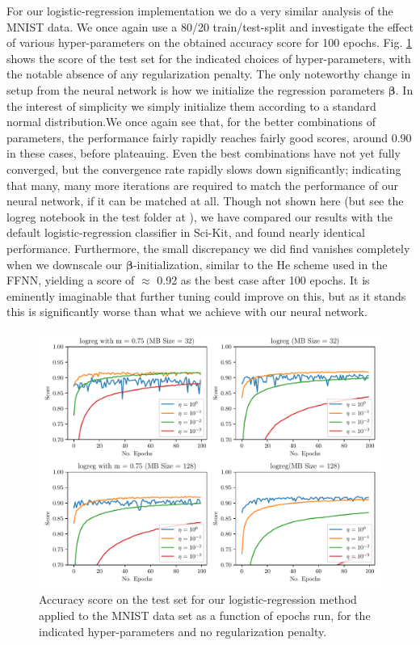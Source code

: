 \documentclass[reprint, english, nofootinbib]{revtex4-2}
\begin{document}
For our logistic-regression implementation we do a very similar analysis of the MNIST data. We once again use a 80/20 train/test-split and investigate the effect of various hyper-parameters on the obtained accuracy score for 100 epochs. Fig. \ref{fig:logreg_learning_rate} shows the score of the test set for the indicated choices of hyper-parameters, with the notable absence of any regularization penalty. The only noteworthy change in setup from the neural network is how we initialize the regression parameters $\mathbf{\beta}$. In the interest of simplicity we simply initialize them according to a standard normal distribution.We once again see that, for the better combinations of parameters, the performance fairly rapidly reaches fairly good scores, around 0.90 in these cases, before plateauing. Even the best combinations have not yet fully converged, but the convergence rate rapidly slows down significantly; indicating that many, many more iterations are required to match the performance of our neural network, if it can be matched at all. Though not shown here (but see the logreg notebook in the test folder at \cite{4155_repo}), we have compared our results with the default logistic-regression classifier in Sci-Kit, and found nearly identical performance. Furthermore, the small discrepancy we did find vanishes completely when we downscale our $\mathbf{\beta}$-initialization, similar to the He \cite{he2015delving} scheme used in the FFNN, yielding a score of $\approx$ 0.92 as the best case after 100 epochs. It is eminently imaginable that further tuning could improve on this, but as it stands this is significantly worse than what we achieve with our neural network.
\begin{figure}
    \includegraphics[width=\columnwidth]{logreg_learning_rate.pdf}
    \caption{\label{fig:logreg_learning_rate}Accuracy score on the test set for our logistic-regression method applied to the MNIST data set as a function of epochs run, for the indicated hyper-parameters and no regularization penalty.}
\end{figure}
\end{document}
